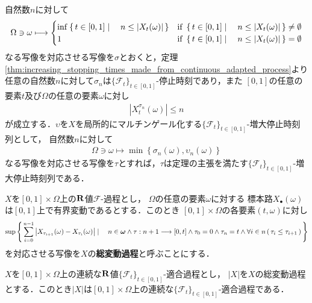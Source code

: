 	\begin{sketch}
		自然数$n$に対して
		\begin{align}
			\Omega \ni \omega \longmapsto
			\begin{cases}
				\operatorname*{inf}_{} \left\{\, t \in [0,1] \mid \quad n \leq |X_{t}(\omega)|\, \right\} 
				& \mbox{if } \left\{\, t \in [0,1] \mid \quad n \leq |X_{t}(\omega)|\, \right\} \neq \emptyset \\
				1 & \mbox{if } \left\{\, t \in [0,1] \mid \quad n \leq |X_{t}(\omega)|\, \right\} = \emptyset
			\end{cases}
		\end{align}
		なる写像を対応させる写像を$\sigma$とおくと，定理\ref{thm:increasing_stopping_times_made_from_continuous_adapted_process}より
		任意の自然数$n$に対して$\sigma_{n}$は$\{\mathscr{F}_{t}\}_{t \in [0,1]}$-停止時刻であり，また
		$[0,1]$の任意の要素$t$及び$\Omega$の任意の要素$\omega$に対し
		\begin{align}
			\left| X^{\sigma_{n}}_{t}(\omega) \right| \leq n
		\end{align}
		が成立する．$\upsilon$を$X$を局所的にマルチンゲール化する$\{\mathscr{F}_{t}\}_{t \in [0,1]}$-増大停止時刻列として，
		自然数$n$に対して
		\begin{align}
			\Omega \ni \omega \longmapsto \min\left\{ \sigma_{n}(\omega),\upsilon_{n}(\omega) \right\}
		\end{align}
		なる写像を対応させる写像を$\tau$とすれば，$\tau$は定理の主張を満たす$\{\mathscr{F}_{t}\}_{t \in [0,1]}$-増大停止時刻列である．
		\QED
	\end{sketch}
	
	\begin{screen}
		\begin{dfn}[総変動過程]
			$X$を$[0,1] \times \Omega$上の$\mathbf{R}$値$\mathscr{F}$-過程とし，
			$\Omega$の任意の要素$\omega$に対する
			標本路$X_{\bullet}(\omega)$は$[0,1]$上で有界変動であるとする．このとき
			$[0,1] \times \Omega$の各要素$(t,\omega)$に対し
			\begin{align}
				\sup{}{
					\Set{\sum_{i=0}^{n-1}\left|X_{\tau_{i+1}}(\omega) - X_{\tau_{i}}(\omega)\right|}{
						n \in \Natural \wedge \tau:n+1 \longrightarrow [0,t] \wedge
						\tau_{0} = 0 \wedge \tau_{n} = t \wedge 
						\forall i \in n\, (\, \tau_{i} \leq \tau_{i+1}\, )
					}
				}
			\end{align}
			を対応させる写像を$X$の{\bf 総変動過程}と呼ぶことにする．
		\end{dfn}
	\end{screen}
	
	\begin{screen}
		\begin{thm}[適合過程の総変動過程は適合]
			$X$を$[0,1] \times \Omega$上の連続な$\mathbf{R}$値$\{\mathscr{F}_{t}\}_{t \in [0,1]}$-適合過程とし，
			$|X|$を$X$の総変動過程とする．このとき$|X|$は$[0,1] \times \Omega$上の連続な$\{\mathscr{F}_{t}\}_{t \in [0,1]}$-適合過程である．
		\end{thm}
	\end{screen}
	
